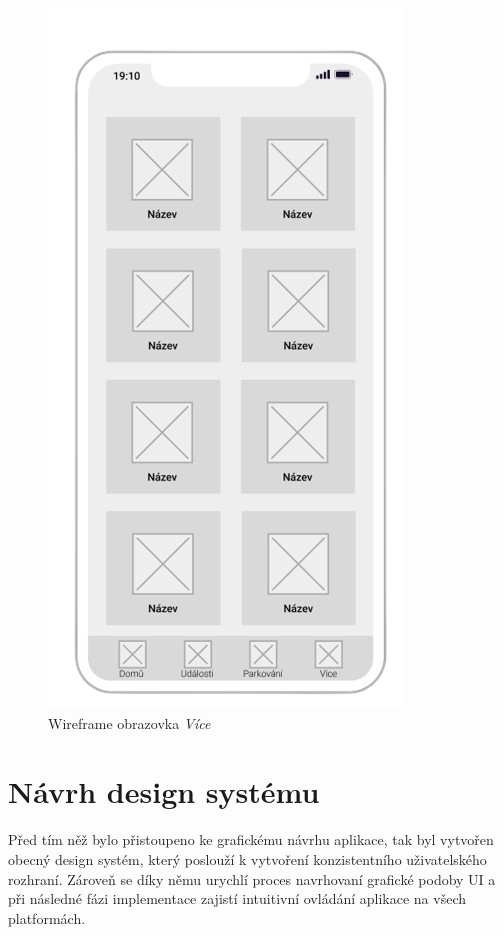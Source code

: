 \begin{minipage}[t]{0.45\textwidth}
\begin{figure}[H]
    \includegraphics[width=.7\textwidth]{more_wireframe.png}
    \caption{Wireframe obrazovka \textit{Více}}
    \label{fig:wireframe4}
  \end{figure}
\end{minipage}

\section{Návrh design systému} \label{designSystemSection}
Před tím něž bylo přistoupeno ke grafickému návrhu aplikace, tak byl vytvořen obecný design systém, který poslouží k vytvoření 
konzistentního uživatelského rozhraní. Zároveň se díky němu urychlí proces navrhovaní grafické podoby UI a při následné fázi implementace 
zajistí intuitivní ovládání aplikace na všech platformách. 


